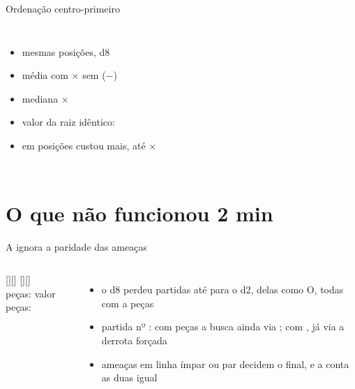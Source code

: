 \documentclass[10pt,aspectratio=169]{beamer}
\newcommand{\fn}[1]{\text{\footnotesize\MakeUppercase{#1}}}
\newcommand{\tempo}[1]{\hfill{\scriptsize\color{black!45}#1}}
\begin{document}
\begin{frame}{Ordenação centro-primeiro}
\begin{columns}[c]
\centering
\graficoOrdenacao[width=0.95\linewidth, height=0.95\linewidth]
\begin{itemize}\small
  \item mesmas  posições, d8
  \item média  com $\times$  sem (\(-\))
  \item mediana  $\times$ 
  \item valor da raiz idêntico: 
  \item \alert{em  posições custou mais}, até $\times$
\end{itemize}
\end{columns}
\end{frame}

\section{O que não funcionou \tempo{2 min}}

\begin{frame}{A \fn{Aval} ignora a paridade das ameaças}
\vspace*{2mm}
\begin{columns}[c]
\centering
\tabuleiro[x=3.2mm,y=3.2mm]{\tabZzAntes}[][\colZzAntes]\hspace{2mm}%
\tabuleiro[x=3.2mm,y=3.2mm]{\tabZzPerdido}[][\colZzPerdido]\\[2pt]
{\scriptsize {} peças: valor  \hspace{6mm}  peças: }
\medskip

\graficoZugzwang[width=\linewidth, height=3.7cm, xlabel={peças quando o d8 (O) decide}, ylabel={}]
\small
\begin{itemize}
  \item o d8 perdeu  partidas até para o d2,  delas como O, todas com
         a  peças
  \item partida nº : com  peças a busca ainda via ;
        com , já via a derrota forçada
  \item ameaças em linha ímpar ou par decidem o final, e a \fn{Aval} conta as duas igual
\end{itemize}
\end{columns}
\end{frame}
\end{document}
